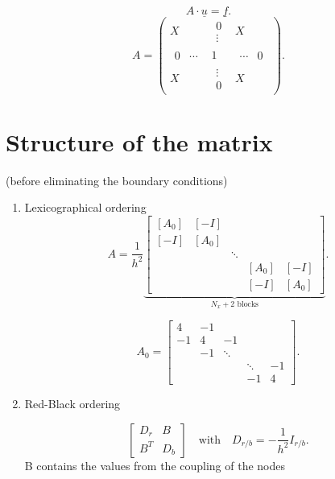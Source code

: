 \[
A\cdot \underline{u} = \underline{f}  
.\] 
\[
A = \begin{pmatrix}
	X & 
	\begin{matrix}
		0 \\
		\vdots
	\end{matrix} & X \\
	\begin{matrix}
		0 & \cdots 
	\end{matrix} & 1 &
	\begin{matrix}
		 \cdots & 0
	\end{matrix}\\
	X & \begin{matrix}
	\vdots \\
	0
	\end{matrix}
	  & X
	
	\end{pmatrix}
.\] 

\section{Structure of the matrix}%
\label{sec:Structure of the matrix}
(before eliminating the boundary conditions)
\begin{enumerate}[label=\alph{enumi})]
	\item Lexicographical ordering
		\[
		A= \frac{1}{h^{2}}
		\underbrace{
		\begin{bmatrix}
			[A_{0}] & [-I] &&& \\
			[-I] & [A_0] &&&\\
				 &&\ddots && \\
				 &&& [A_0] & [-I] \\
				 &&& [-I]& [A_0]
		\end{bmatrix}
		}_{N_{x}+2 \text{ blocks}}
		.\] 

		\[
		A_0 = \begin{bmatrix}
			4 & -1 &&& \\
			-1 & 4 & -1 && \\
			 & -1 & \ddots && \\
			 &&&\ddots & -1 \\
			 &&&-1 & 4
		\end{bmatrix}
		.\] 
	\item Red-Black ordering

		\[
			\begin{bmatrix}
				D_{r} & B \\
				B^{T} & D_{b}
			\end{bmatrix}
			\quad \text{with}\quad D_{r/b}=-\frac{1}{h^{2}}I_{r/b}
		.\] 
		B contains the values from the coupling of the nodes
\end{enumerate}

